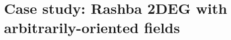 \documentclass[aps, prb, showpacs, twocolumn, notitlepage, superscriptaddress]{revtex4-1}
\begin{document}



\section{Case study: Rashba 2DEG with arbitrarily-oriented fields}


\end{document}
